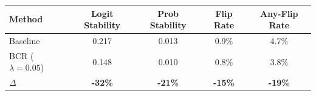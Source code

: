 \begin{tabular}{lcccc}
\toprule
Method & Logit Stability & Prob Stability & Flip Rate & Any-Flip Rate \\
\midrule
Baseline & 0.217 & 0.013 & 0.9\% & 4.7\% \\
BCR ($\lambda=0.05$) & 0.148 & 0.010 & 0.8\% & 3.8\% \\
\midrule
$\Delta$ & \textbf{-32\%} & \textbf{-21\%} & \textbf{-15\%} & \textbf{-19\%} \\
\bottomrule
\end{tabular}
